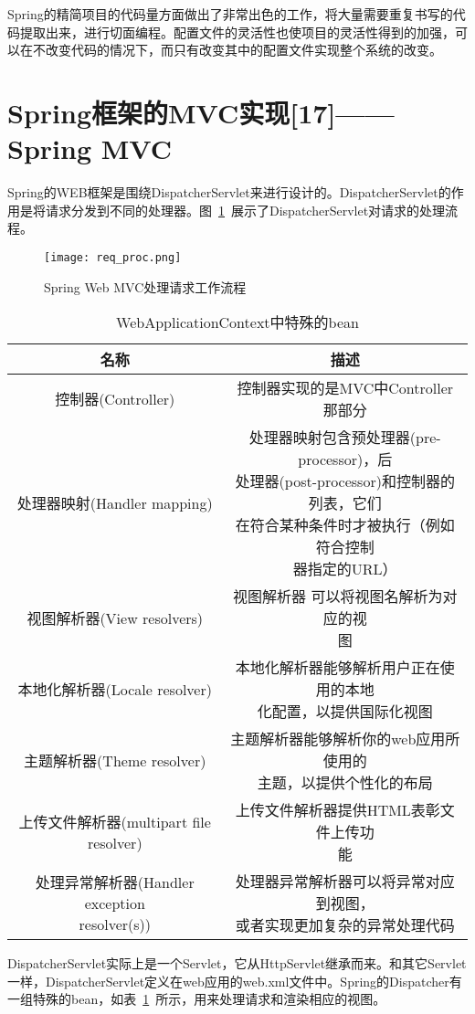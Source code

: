Spring的精简项目的代码量方面做出了非常出色的工作，将大量需要重复书写的代码提取出来，进行切面编程。配置文件的灵活性也使项目的灵活性得到的加强，可以在不改变代码的情况下，而只有改变其中的配置文件实现整个系统的改变。

\section{Spring框架的MVC实现[17]——Spring MVC}
Spring的WEB框架是围绕DispatcherServlet来进行设计的。DispatcherServlet的作用是将请求分发到不同的处理器。图~\ref{fig:req_proc}~展示了DispatcherServlet对请求的处理流程。
\begin{figure}[htbp]
\centering
\texttt{[image: req\_proc.png]}
\caption{Spring Web MVC处理请求工作流程}\label{fig:req_proc}
\vspace{\baselineskip}
\end{figure}
\begin{table}[htbp]
\caption{WebApplicationContext中特殊的bean}\label{tab:bean}
\vspace{0.5em}\centering\wuhao
\begin{tabular}{|c|c|}
\toprule[1.5pt]
名称 & 描述\\
\midrule[1pt]
控制器(Controller) & 控制器实现的是MVC中Controller那部分\\\hline
处理器映射(Handler mapping) & \tabincell{c}{处理器映射包含预处理器(pre-processor)，后\\处理器(post-processor)和控制器的列表，它们\\在符合某种条件时才被执行（例如符合控制 \\器指定的URL）}\\\hline
视图解析器(View resolvers) & \tabincell{c}{视图解析器 可以将视图名解析为对应的视\\图}\\\hline
本地化解析器(Locale resolver) & \tabincell{c}{本地化解析器能够解析用户正在使用的本地\\化配置，以提供国际化视图}\\\hline
主题解析器(Theme resolver) & \tabincell{c}{主题解析器能够解析你的web应用所使用的\\主题，以提供个性化的布局}\\\hline
上传文件解析器(multipart file resolver) & \tabincell{c}{上传文件解析器提供HTML表彰文件上传功\\能}\\\hline
\tabincell{c}{处理异常解析器(Handler exception \\ resolver(s))} & \tabincell{c}{处理器异常解析器可以将异常对应到视图，\\或者实现更加复杂的异常处理代码}\\
\bottomrule[1.5pt]
\end{tabular}
\vspace{\baselineskip}
\end{table}
DispatcherServlet实际上是一个Servlet，它从HttpServlet继承而来。和其它Servlet一样，DispatcherServlet定义在web应用的web.xml文件中。Spring的Dispatcher有一组特殊的bean，如表~\ref{tab:bean}~所示，用来处理请求和渲染相应的视图。

